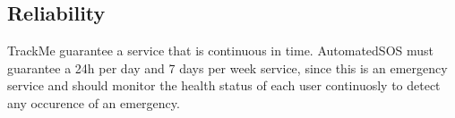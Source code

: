 \subsection{Reliability}
TrackMe guarantee a service that is continuous in time.
AutomatedSOS must guarantee a 24h per day and 7 days per week service, since this is an emergency service and should monitor the health status of each user continuosly to detect any occurence of an emergency.

